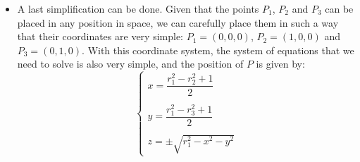 \begin{itemize}
    Taking the first equation minus the second equation, we get:
    \begin{equation*}
        (x^2+y^2+z^2)-[(x-d)^2+y^2+z^2]=r_1^2-r_2^2
        \Longrightarrow
        2dx - d^2=r_1^2-r_2^2
        \Longrightarrow
        x=\frac{r_1^2-r_2^2+d^2}{2d}
    \end{equation*}

    Taking the first equation minus the third equation, we get:
    \begin{multline*}
        (x^2+y^2+z^2)-[(x-i)^2+(y-j)^2+z^2]=r_1^2-r_3^2
        \Longrightarrow
        2ix+2jy-i^2-j^2=r_1^2-r_3^2
        \Longrightarrow \\ \Longrightarrow
        y=\frac{r_1^2-r_3^2+i^2+j^2-2ix}{2j}
    \end{multline*}

    Finally, we can substitute the values of $x$ and $y$ in the first equation to get the value of $z$.
    \begin{equation*}
        z=\pm\sqrt{r_1^2-x^2-y^2}
    \end{equation*}

    Therefore, the position of $P=(x,y,z)$ in that given coordinate system is given by:
    \begin{equation*}
        \begin{cases}
            x=\dfrac{r_1^2-r_2^2+d^2}{2d}\\ \\
            y=\dfrac{r_1^2-r_3^2+i^2+j^2-2ix}{2j}\\ \\
            z=\pm\sqrt{r_1^2-x^2-y^2}
        \end{cases}
    \end{equation*}
    As we can see, two possible positions of $P$ are obtained.

    \item A last simplification can be done. Given that the points $P_1$, $P_2$ and $P_3$ can be placed in any position in space, we can carefully place them in such a way that their coordinates are very simple: $P_1=(0,0,0)$, $P_2=(1,0,0)$ and $P_3=(0,1,0)$. With this coordinate system, the system of equations that we need to solve is also very simple, and the position of $P$ is given by:
    \begin{equation*}
        \begin{cases}
            x=\dfrac{r_1^2-r_2^2+1}{2}\\ \\
            y=\dfrac{r_1^2-r_3^2+1}{2}\\ \\
            z=\pm\sqrt{r_1^2-x^2-y^2}
        \end{cases}
    \end{equation*}
\end{itemize}

